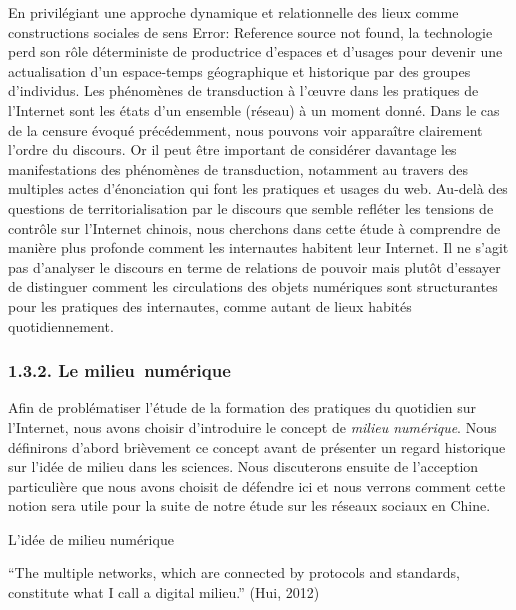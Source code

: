 {\color{black}
En privil\'egiant une approche dynamique et relationnelle des lieux comme constructions sociales de sens Error:
Reference source not found, la technologie perd son r\^ole d\'eterministe de productrice d'espaces et d'usages pour
devenir une actualisation d'un espace-temps g\'eographique et historique par des groupes d'individus. Les
ph\'enom\`enes de transduction \`a l'{\oe}uvre dans les pratiques de l'Internet sont les \'etats d'un ensemble
(r\'eseau) \`a un moment donn\'e. Dans le cas de la censure \'evoqu\'e pr\'ec\'edemment, nous pouvons voir appara\^itre
clairement l'ordre du discours. Or il peut \^etre important de consid\'erer davantage les manifestations des
ph\'enom\`enes de transduction, notamment au travers des multiples actes d'\'enonciation qui font les pratiques et
usages du web. Au-del\`a des questions de territorialisation par le discours que semble refl\'eter les tensions de
contr\^ole sur l'Internet chinois, nous cherchons dans cette \'etude \`a comprendre de mani\`ere plus profonde comment
les internautes habitent leur Internet. Il ne s'agit pas d'analyser le discours en terme de relations de pouvoir mais
plut\^ot d'essayer de distinguer comment les circulations des objets num\'eriques sont structurantes pour les pratiques
des internautes, comme autant de lieux habit\'es quotidiennement.}

\subsubsection[1.3.2. Le milieu~num\'erique]{1.3.2. Le milieu~num\'erique}
\hypertarget{RefHeading251699228146}{}
\bigskip

{\color{black}
Afin de probl\'ematiser l'\'etude de la formation des pratiques du quotidien sur l'Internet, nous avons choisir
d'introduire le concept de \textit{milieu num\'erique}. Nous d\'efinirons d'abord bri\`evement ce concept avant de
pr\'esenter un regard historique sur l'id\'ee de milieu dans les sciences. Nous discuterons ensuite de l'acception
particuli\`ere que nous avons choisit de d\'efendre ici et nous verrons comment cette notion sera utile pour la suite
de notre \'etude sur les r\'eseaux sociaux en Chine.}


\bigskip

{\color{black}
L'id\'ee de milieu num\'erique }

{\color{black}
{}``The multiple networks, which are connected by protocols and standards, constitute what I call a digital milieu.''
(Hui, 2012)}


